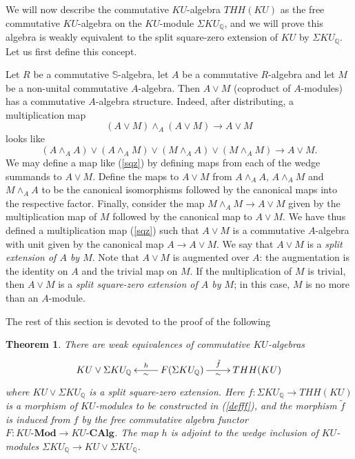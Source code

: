 \documentclass[a4paper,11pt]{amsart} %
\theoremstyle{definition} \newtheorem{defn}[equation]{Definition}
\theoremstyle{remark} \newtheorem{notation}[equation]{Notation}
\theoremstyle{plain} \newtheorem{teo}[equation]{Theorem}
\theoremstyle{plain} \newtheorem{lema}[equation]{Lemma}
\theoremstyle{plain} \newtheorem{prop}[equation]{Proposition}
\theoremstyle{plain} \newtheorem{corolario}[equation]{Corollary}
\theoremstyle{remark} \newtheorem{obs}[equation]{Remark}
\theoremstyle{remark} \newtheorem{sideobs}[equation]{Side remark}
\theoremstyle{remark} \newtheorem{ejercicio}[equation]{Exercise}
\theoremstyle{definition} \newtheorem{notn}[equation]{Notation}
\theoremstyle{remark} \newtheorem{ej}[equation]{Example}
\theoremstyle{remark} \newtheorem{contraej}[equation]{Counterexample}
\theoremstyle{plain} \newtheorem{conj}[equation]{Conjecture}
\renewcommand{\1}{\ensuremath{\mathbbm{1}}}
\newcommand{\Q}{\mathbb{Q}}
\renewcommand{\S}{\mathbb{S}}
\newcommand{\bteo}{\begin{teo}}
\newcommand{\eteo}{\end{teo}}
\newcommand{\Mod}{\mbox{-}\mathbf{Mod}}
\newcommand{\CAlg}{\mbox{-}\mathbf{CAlg}}
\numberwithin{equation}{section}
\begin{document}
We will now describe the commutative $KU$-algebra $THH(KU)$ as the free commutative $KU$-algebra on the $KU$-module $\Sigma KU_\Q$, %
and we will prove this algebra is weakly equivalent to the split square-zero extension of $KU$ by $\Sigma KU_\Q$. Let us first define this concept. 

Let $R$ be a commutative $\S$-algebra, let $A$ be a commutative $R$-algebra and let $M$ be a non-unital commutative $A$-algebra. Then $A\vee M$ (coproduct of $A$-modules) has a commutative $A$-algebra structure. Indeed, after distributing, a multiplication map
\[(A\vee M) \wedge_A (A\vee M) \to A\vee M\]
looks like
\begin{equation}\label{sqz}(A\wedge_A A) \vee (A\wedge_A M) \vee (M\wedge_A A) \vee (M\wedge_A M) \to A\vee M.\end{equation}
We may define a map like (\ref{sqz}) by defining maps from each of the wedge summands to $A\vee M$. %
Define the maps to $A\vee M$ from $A\wedge_A A$, $A\wedge_A M$ and $M\wedge_A A$ to be the canonical isomorphisms followed by the canonical maps into the respective factor. Finally, consider the map $M\wedge_A M\to A\vee M$ given by the multiplication map of $M$ followed by the canonical map to $A\vee M$. We have thus defined a multiplication map (\ref{sqz}) such that $A\vee M$ is a commutative $A$-algebra with unit given by the canonical map $A\to A\vee M$. We say that $A\vee M$ is a \emph{split extension of $A$ by $M$}. Note that $A\vee M$ is augmented over $A$: the augmentation is the identity on $A$ and the trivial map on $M$. 
If the multiplication of $M$ is trivial, then $A\vee M$ is a \emph{split square-zero extension of $A$ by $M$}; in this case, $M$ is no more than an $A$-module. %



The rest of this section is devoted to the proof of the following

%
\bteo \label{thhku2} There are weak equivalences of commutative $KU$-algebras
\[\xymatrix{KU \vee \Sigma KU_\Q & F(\Sigma KU_\Q) \ar[l]_-h^-\sim \ar[r]^-{\tilde f}_-\sim & THH(KU)}\]
where $KU \vee \Sigma KU_\Q$ is a split square-zero extension. Here $f:\Sigma KU_\Q\to THH(KU)$ is a morphism of $KU$-modules to be constructed in (\ref{defff}), and the morphism $\tilde f$ is induced from $f$ by the free commutative algebra functor $F:KU\Mod\to KU\CAlg$. The map $h$ is adjoint to the wedge inclusion of $KU$-modules $\Sigma KU_\Q \to KU \vee \Sigma KU_\Q$.
%
%
%
%
%
%
%
%
%
%
%
%
%
\eteo
\end{document}
